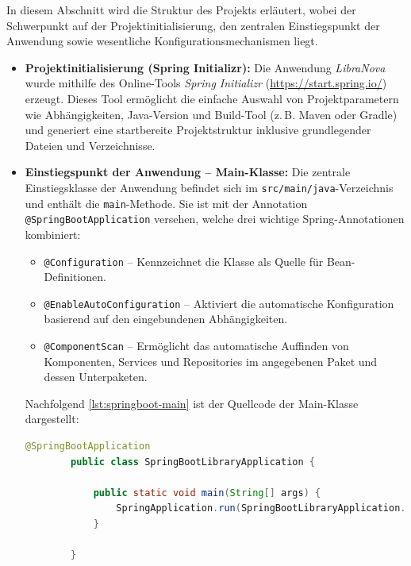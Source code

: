 \noindent In diesem Abschnitt wird die Struktur des Projekts erläutert, wobei der Schwerpunkt auf der Projektinitialisierung, den zentralen Einstiegspunkt der Anwendung sowie wesentliche Konfigurationsmechanismen liegt.
\begin{itemize}
	\item \textbf{Projektinitialisierung (Spring Initializr):} Die Anwendung \textit{LibraNova} wurde mithilfe des Online-Tools \textit{Spring Initializr} (\url{https://start.spring.io/}) erzeugt. Dieses Tool ermöglicht die einfache Auswahl von Projektparametern wie Abhängigkeiten, Java-Version und Build-Tool (z.\,B. Maven oder Gradle) und generiert eine startbereite Projektstruktur inklusive grundlegender Dateien und Verzeichnisse.
	
	\item \textbf{Einstiegspunkt der Anwendung – Main-Klasse:} Die zentrale Einstiegsklasse der Anwendung befindet sich im \texttt{src/main/java}-Verzeichnis und enthält die \texttt{main}-Methode. Sie ist mit der Annotation \texttt{@SpringBootApplication} versehen, welche drei wichtige Spring-Annotationen kombiniert:
	\begin{itemize}
		\item \texttt{@Configuration} – Kennzeichnet die Klasse als Quelle für Bean-Definitionen.
		\item \texttt{@EnableAutoConfiguration} – Aktiviert die automatische Konfiguration basierend auf den eingebundenen Abhängigkeiten.
		\item \texttt{@ComponentScan} – Ermöglicht das automatische Auffinden von Komponenten, Services und Repositories im angegebenen Paket und dessen Unterpaketen.
	\end{itemize}
	
	Nachfolgend \ref{lst:springboot-main} ist der Quellcode der Main-Klasse dargestellt:
	
	\begin{lstlisting}[language=Java, caption=Einstiegspunkt der Spring Boot Anwendung, label=lst:springboot-main, breaklines=true]
		@SpringBootApplication
		public class SpringBootLibraryApplication {
			
			public static void main(String[] args) {
				SpringApplication.run(SpringBootLibraryApplication.class, args);
			}
			
		}
	\end{lstlisting}


\end{itemize}
